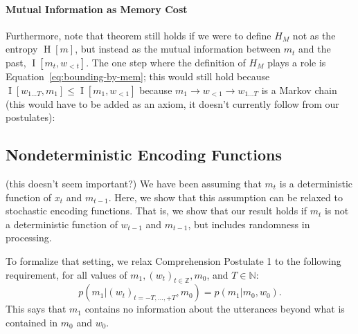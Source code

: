 \documentclass[11pt,letterpaper]{article}
\newcommand\mhahn[1]{{\color{red}(#1)}}
\newcounter{theorem}
\begin{document}


\paragraph{Mutual Information as Memory Cost}
Furthermore, note that theorem still holds if we were to define $H_M$ not as the entropy $\operatorname{H}[m]$, but instead as the mutual information between $m_t$ and the past, $\operatorname{I}[m_t, w_{<t}]$.
The one step where the definition of $H_M$ plays a role is Equation~\ref{eq:bounding-by-mem}; this would still hold because $\operatorname{I}[w_{1\dots T}, m_1] \leq \operatorname{I}[m_1, w_{<1}]$ because $m_1 \rightarrow w_{<1} \rightarrow w_{1\dots T}$ is a Markov chain \mhahn{this would have to be added as an axiom, it doesn't currently follow from our postulates}:



\subsection{Nondeterministic Encoding Functions}
\mhahn{this doesn't seem important?}
We have been assuming that $m_t$ is a deterministic function of $x_t$ and $m_{t-1}$.
Here, we show that this assumption can be relaxed to stochastic encoding functions.
That is, we show that our result holds if
$m_t$ is not a deterministic function of $w_{t-1}$ and $m_{t-1}$, but includes randomness in processing.

To formalize that setting, we relax Comprehension Postulate 1 to the following requirement, for all values of $m_1, (w_{t})_{t \in \mathbb{Z}}, m_0$, and $T \in \mathbb{N}$:
\begin{equation}\label{eq:listener-markov-nondeterministic}
p(m_1| (w_{t})_{t = -T, \dots, +T}, m_0)   = p(m_1 | m_0, w_0).
\end{equation}
This says that $m_1$ contains no information about the utterances beyond what is contained in $m_0$ and $w_0$.	
\end{document}
